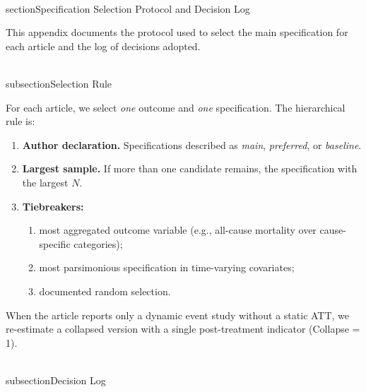 \\section{Specification Selection Protocol and Decision Log}
\label{AppendixA}

This appendix documents the protocol used to select the main specification for each article and the log of decisions adopted.

\\subsection{Selection Rule}

For each article, we select \emph{one} outcome and \emph{one} specification. The hierarchical rule is:

\begin{enumerate}[label=\roman*.]
  \item \textbf{Author declaration.} Specifications described as \emph{main}, \emph{preferred}, or \emph{baseline}.
  \item \textbf{Largest sample.} If more than one candidate remains, the specification with the largest $N$.
  \item \textbf{Tiebreakers:}
    \begin{enumerate}[label=(\alph*)]
      \item most aggregated outcome variable (e.g., all-cause mortality over cause-specific categories);
      \item most parsimonious specification in time-varying covariates;
      \item documented random selection.
    \end{enumerate}
\end{enumerate}

When the article reports only a dynamic event study without a static ATT, we re-estimate a collapsed version with a single post-treatment indicator (Collapse = 1).

\newpage
\\subsection{Decision Log}

